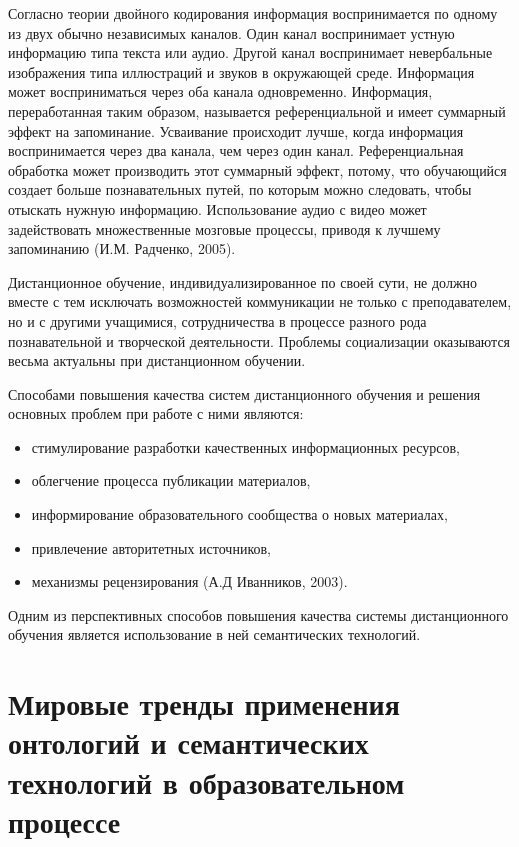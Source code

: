 Согласно теории двойного кодирования информация воспринимается по одному из двух обычно независимых каналов. Один канал воспринимает устную информацию типа текста или аудио. Другой канал воспринимает невербальные изображения типа иллюстраций и звуков в окружающей среде. Информация может восприниматься через оба канала одновременно. Информация, переработанная таким образом, называется референциальной и имеет суммарный эффект на запоминание. Усваивание происходит лучше, когда информация воспринимается через два канала, чем через один канал. Референциальная обработка может производить этот суммарный эффект, потому, что обучающийся создает больше познавательных путей, по которым можно следовать, чтобы отыскать нужную информацию. Использование аудио с видео может задействовать множественные мозговые процессы, приводя к лучшему запоминанию (И.М. Радченко, 2005).

Дистанционное обучение, индивидуализированное по своей сути, не должно вместе с тем исключать возможностей коммуникации не только с преподавателем, но и с другими учащимися, сотрудничества в процессе разного рода познавательной и творческой деятельности. Проблемы социализации оказываются весьма актуальны при дистанционном обучении. 

Способами повышения качества систем дистанционного обучения и решения основных проблем при работе с ними являются: 

\begin{itemize}
\item стимулирование разработки качественных информационных ресурсов,
\item облегчение процесса публикации материалов, 
\item информирование образовательного сообщества о новых материалах,
\item привлечение авторитетных источников, 
\item механизмы рецензирования (А.Д Иванников, 2003).
\end{itemize}

Одним из перспективных способов повышения качества системы дистанционного обучения является использование в ней семантических технологий.



\section{Мировые тренды применения онтологий и семантических технологий в образовательном процессе} \label{sect1_3}

